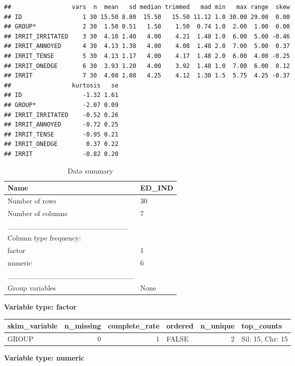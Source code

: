 \documentclass[
]{book}
\begin{document}
\begin{verbatim}
##                 vars  n  mean   sd median trimmed   mad min   max range  skew
## ID                 1 30 15.50 8.80  15.50   15.50 11.12 1.0 30.00 29.00  0.00
## GROUP*             2 30  1.50 0.51   1.50    1.50  0.74 1.0  2.00  1.00  0.00
## IRRIT_IRRITATED    3 30  4.10 1.40   4.00    4.21  1.48 1.0  6.00  5.00 -0.46
## IRRIT_ANNOYED      4 30  4.13 1.38   4.00    4.08  1.48 2.0  7.00  5.00  0.37
## IRRIT_TENSE        5 30  4.13 1.17   4.00    4.17  1.48 2.0  6.00  4.00 -0.25
## IRRIT_ONEDGE       6 30  3.93 1.20   4.00    3.92  1.48 1.0  7.00  6.00  0.12
## IRRIT              7 30  4.08 1.08   4.25    4.12  1.30 1.5  5.75  4.25 -0.37
##                 kurtosis   se
## ID                 -1.32 1.61
## GROUP*             -2.07 0.09
## IRRIT_IRRITATED    -0.52 0.26
## IRRIT_ANNOYED      -0.72 0.25
## IRRIT_TENSE        -0.95 0.21
## IRRIT_ONEDGE        0.37 0.22
## IRRIT              -0.82 0.20
\end{verbatim}

\begin{table}

\caption{\label{tab:unnamed-chunk-100}Data summary}
\centering
\begin{tabular}[t]{l|l}
\hline
Name & ED\_IND\\
\hline
Number of rows & 30\\
\hline
Number of columns & 7\\
\hline
\_\_\_\_\_\_\_\_\_\_\_\_\_\_\_\_\_\_\_\_\_\_\_ & \\
\hline
Column type frequency: & \\
\hline
factor & 1\\
\hline
numeric & 6\\
\hline
\_\_\_\_\_\_\_\_\_\_\_\_\_\_\_\_\_\_\_\_\_\_\_\_ & \\
\hline
Group variables & None\\
\hline
\end{tabular}
\end{table}

\textbf{Variable type: factor}

\begin{tabular}{l|r|r|l|r|l}
\hline
skim\_variable & n\_missing & complete\_rate & ordered & n\_unique & top\_counts\\
\hline
GROUP & 0 & 1 & FALSE & 2 & Sil: 15, Chr: 15\\
\hline
\end{tabular}

\textbf{Variable type: numeric}
\end{document}
